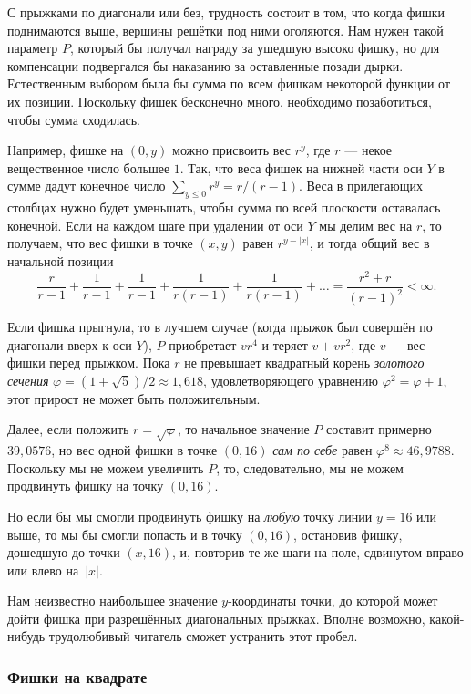 \medskip

С прыжками по диагонали или без, трудность состоит в том, что когда фишки поднимаются выше, вершины решётки под ними оголяются.
Нам нужен такой параметр $P$, который бы получал награду за ушедшую высоко фишку, но для компенсации подвергался бы наказанию за оставленные позади дырки.
Естественным выбором была бы сумма по всем фишкам некоторой функции от их позиции.
Поскольку фишек бесконечно много, необходимо позаботиться, чтобы сумма сходилась.

Например, фишке на $(0, y)$ можно присвоить вес $r^y$, где $r$ --- некое вещественное число большее $1$.
Так, что веса фишек на нижней части оси $Y$ в сумме дадут конечное число $\sum_{y\le 0}r^y = r/(r-1)$.
Веса в прилегающих столбцах нужно будет уменьшать, чтобы сумма по всей плоскости оставалась конечной.
Если на каждом шаге при удалении от оси $Y$ мы делим вес на $r$, то получаем, что вес фишки в точке $(x, y)$ равен $r^{y - |x|}$, и тогда общий вес в начальной позиции 
\[\frac r{r-1} + \frac 1{r-1} +\frac 1{r-1} +\frac 1{r(r-1)} +\frac 1{r(r-1)} + \dots =\frac{r^2+r}{(r-1)^2} <\infty.\]

Если фишка прыгнула, то в лучшем случае (когда прыжок был совершён по диагонали вверх к оси $Y$), $P$ приобретает $vr^4$ и теряет $v+vr^2$, где $v$ --- вес фишки перед прыжком.
Пока $r$ не превышает квадратный корень \emph{золотого сечения} $\varphi=(1+\sqrt5)/2\approx 1{,}618$, удовлетворяющего уравнению $\varphi^2=\varphi+1$, этот прирост не может быть положительным.

Далее, если положить $r = \sqrt{\varphi}$, то начальное значение $P$ составит примерно $39{,}0576$, но вес одной фишки в точке $(0, 16)$ \emph{сам по себе} равен $\varphi^8\approx 46{,}9788$.
Поскольку мы не можем увеличить $P$, то, следовательно, мы не можем продвинуть фишку на точку $(0, 16)$.

Но если бы мы смогли продвинуть фишку на \emph{любую} точку линии $y = 16$ или выше, то мы бы смогли попасть и в точку $(0, 16)$, остановив фишку, дошедшую до точки $(x, 16)$, и, повторив те же шаги на поле, сдвинутом вправо или влево на~$|x|$.
\heart

{\sloppy 

Нам неизвестно наибольшее значение $y$-координаты точки, до которой может дойти фишка при разрешённых диагональных прыжках.
Вполне возможно, какой-нибудь трудолюбивый читатель сможет устранить этот пробел.

}

\subsubsection*{Фишки на квадрате}%

